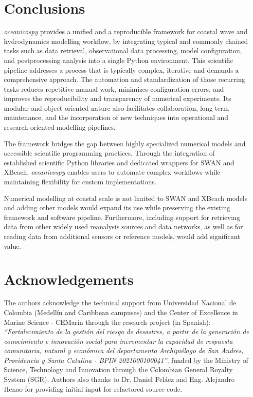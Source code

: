 \documentclass[preprint,12pt, a4paper]{elsarticle}
\begin{document}
\section{Conclusions}

\textit{oceanicospy} provides a unified and a reproducible framework for coastal wave and hydrodynamics modelling workflow, by integrating typical and commonly chained tasks such as data retrieval, observational data processing, model configuration, and postprocessing analysis into a single Python environment. This scientific pipeline addresses a process that is typically complex, iterative and demands a comprehensive approach. The automation and standardization of those recurring tasks reduces repetitive manual work, minimizes configuration errors, and improves the reproducibility and transparency of numerical experiments. Its modular and object-oriented nature also facilitates collaboration, long-term maintenance, and the incorporation of new techniques into operational and research-oriented modelling pipelines.

The framework bridges the gap between highly specialized numerical models and accessible scientific programming practices. Through the integration of established scientific Python libraries and dedicated wrappers for SWAN and XBeach, \textit{oceanicospy} enables users to automate complex workflows while maintaining flexibility for custom implementations.

Numerical modelling at coastal scale is not limited to SWAN and XBeach models and adding other models would expand its use while preserving the existing framework and software pipeline. Furthermore, including support for retrieving data from other widely used reanalysis sources and data networks, as well as for reading data from additional sensors or reference models, would add significant value.

\section*{Acknowledgements}
\label{}

The authors acknowledge the technical support from Universidad Nacional de Colombia (Medellín and Caribbean campuses) and the Center of Excellence in Marine Science - CEMarin through the research project (in Spanish): \textit{“Fortalecimiento de la gestión del riesgo de desastres, a partir de la generación de conocimiento e innovación social para incrementar la capacidad de respuesta comunitaria, natural y económica del departamento Archipiélago de San Andres, Providencia y Santa Catalina - BPIN 2021000100041”}, funded by the Ministry of Science, Technology and Innovation through the Colombian General Royalty System (SGR).  Authors also thanks to Dr. Daniel Peláez and Eng. Alejandro Henao for providing initial input for refactored source code. 
\end{document}
